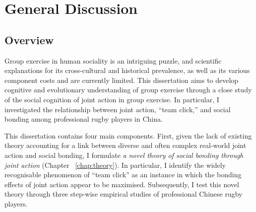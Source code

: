 

\chapter{\label{generalDiscussion}General Discussion}


\section{Overview}


Group exercise in human sociality is an intriguing puzzle, and scientific explanations for its cross-cultural and historical prevalence, as well as its various component costs and are currently limited.  This dissertation aims to develop cognitive and evolutionary understanding of group exercise through a close study of the social cognition of joint action in group exercise.  In particular, I investigated the relationship between joint action, ``team click,'' and social bonding among professional rugby players in China.

This dissertation contains four main components.  First, given the lack of existing theory accounting for a link between diverse and often complex real-world joint action and social bonding, I formulate \textit{a novel theory of social bonding through joint action} (Chapter ~\ref{chap:theory}).  In particular, I identify the widely recognisable phenomenon of ``team click'' as an instance in which the bonding effects of joint action appear to be maximised.  Subsequently, I test this novel theory through three step-wise empirical studies of professional Chinese rugby players.

